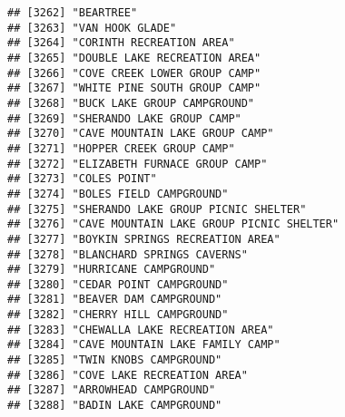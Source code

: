 \documentclass[
]{article}
\begin{document}
\begin{verbatim}
## [3262] "BEARTREE"                                                                            
## [3263] "VAN HOOK GLADE"                                                                      
## [3264] "CORINTH RECREATION AREA"                                                             
## [3265] "DOUBLE LAKE RECREATION AREA"                                                         
## [3266] "COVE CREEK LOWER GROUP CAMP"                                                         
## [3267] "WHITE PINE SOUTH GROUP CAMP"                                                         
## [3268] "BUCK LAKE GROUP CAMPGROUND"                                                          
## [3269] "SHERANDO LAKE GROUP CAMP"                                                            
## [3270] "CAVE MOUNTAIN LAKE GROUP CAMP"                                                       
## [3271] "HOPPER CREEK GROUP CAMP"                                                             
## [3272] "ELIZABETH FURNACE GROUP CAMP"                                                        
## [3273] "COLES POINT"                                                                         
## [3274] "BOLES FIELD CAMPGROUND"                                                              
## [3275] "SHERANDO LAKE GROUP PICNIC SHELTER"                                                  
## [3276] "CAVE MOUNTAIN LAKE GROUP PICNIC SHELTER"                                             
## [3277] "BOYKIN SPRINGS RECREATION AREA"                                                      
## [3278] "BLANCHARD SPRINGS CAVERNS"                                                           
## [3279] "HURRICANE CAMPGROUND"                                                                
## [3280] "CEDAR POINT CAMPGROUND"                                                              
## [3281] "BEAVER DAM CAMPGROUND"                                                               
## [3282] "CHERRY HILL CAMPGROUND"                                                              
## [3283] "CHEWALLA LAKE RECREATION AREA"                                                       
## [3284] "CAVE MOUNTAIN LAKE FAMILY CAMP"                                                      
## [3285] "TWIN KNOBS CAMPGROUND"                                                               
## [3286] "COVE LAKE RECREATION AREA"                                                           
## [3287] "ARROWHEAD CAMPGROUND"                                                                
## [3288] "BADIN LAKE CAMPGROUND"                                                               

\end{verbatim}
\end{document}
